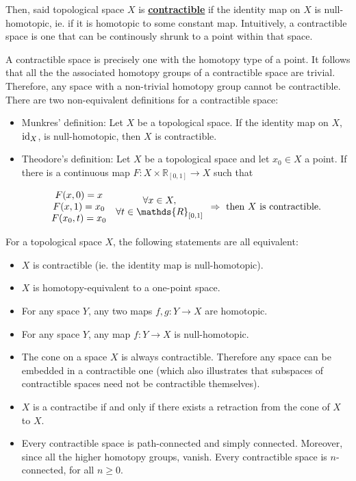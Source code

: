 \documentclass{homework}
\begin{document}
 Then, said topological space $X$ is \underline{\textbf{contractible}} if the identity map on $X$ is null-homotopic, ie. if it is homotopic to some constant map. Intuitively, a contractible space is one that can be continously shrunk to a point within that space.

A contractible space is precisely one with the homotopy type of a point. It follows that all the the associated homotopy groups of a contractible space are trivial. Therefore, any space with a non-trivial homotopy group cannot be contractible. There are two non-equivalent definitions for a contractible space:

\begin{itemize}
    \item Munkres' definition: Let $X$ be a topological space. If the identity map on $X$, $\textnormal{id}_X$, is null-homotopic, then $X$ is contractible. 
    \item Theodore's definition: Let $X$ be a topological space and let $x_0 \in X$ a point. If there is a continuous map $F: X \times \mathds{R}_{[0,1]} \rightarrow X$ such that 
    
    \begin{align}
    \begin{array}{c}
         F(x, 0) = x \\
         F(x, 1) = x_0 \\
         F(x_0, t) = x_0  
    \end{array} \begin{array}{c}
        \forall x \in X, \\
        \forall t \in \mathds{R}_{[0,1]}
    \end{array} 
    \Rightarrow \textnormal{ then $X$ is contractible. }
    \end{align}
\end{itemize}

For a topological space $X$, the following statements are all equivalent:

\begin{itemize}
    \item $X$ is contractible (ie. the identity map is null-homotopic). 
    \item $X$ is homotopy-equivalent to a one-point space. 
    \item For any space $Y$, any two maps $f, g: Y \rightarrow X$ are homotopic.
    \item For any space $Y$, any map $f: Y \rightarrow X$ is null-homotopic. 
    \item The cone on a space $X$ is always contractible. Therefore any space can be embedded in a contractible one (which also illustrates that subspaces of contractible spaces need not be contractible themselves).
    \item $X$ is a contractibe if and only if there exists a retraction from the cone of $X$ to $X$.
    \item Every contractible space is path-connected and simply connected. Moreover, since all the higher homotopy groups, vanish. Every contractible space is $n$-connected, for all $n \geq 0$.\\ 
\end{itemize}
\end{document}
